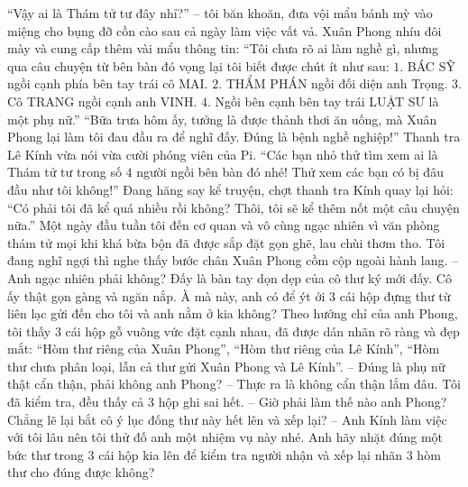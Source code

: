 	“Vậy ai là Thám tử tư đây nhỉ?” -- tôi băn khoăn, đưa vội mẩu bánh mỳ vào miệng cho bụng đỡ cồn cào sau cả ngày làm việc vất vả. 
	\vskip 0.1cm
	Xuân Phong nhíu đôi mày và cung cấp thêm vài mẩu thông tin: “Tôi chưa rõ ai làm nghề gì, nhưng qua câu chuyện từ bên bàn đó vọng lại tôi biết được chút ít như sau: 
	\vskip 0.1cm
	$1.$ BÁC SỸ ngồi cạnh phía bên tay trái cô MAI. 
	\vskip 0.1cm
	$2.$ THẨM PHÁN ngồi đối diện anh Trọng.
	\vskip 0.1cm
	$3.$ Cô TRANG ngồi cạnh anh VINH. 
	\vskip 0.1cm
	$4.$ Ngồi bên cạnh bên tay trái LUẬT SƯ là một phụ nữ.” 
	\vskip 0.1cm
	“Bữa trưa hôm ấy, tưởng là được thảnh thơi ăn uống, mà Xuân Phong lại làm tôi đau đầu ra để nghĩ đấy. Đúng là bệnh nghề nghiệp!” Thanh tra Lê Kính vừa nói vừa cười phóng viên của Pi. “Các bạn nhỏ thử tìm xem ai là Thám tử tư trong số $4$ người ngồi bên bàn đó nhé! Thử xem các bạn có bị đâu đầu như tôi không!”
	\vskip 0.1cm
	Đang hăng say kể truyện, chợt thanh tra Kính quay lại hỏi: “Có phải tôi đã kể quá nhiều rồi không? Thôi, tôi sẽ kể thêm nốt một câu chuyện nữa.”
	\vskip 0.1cm
	{\color{toanhocdoisong}{BA CHIẾC HỘP VÀ CÔ THƯ KÝ}}
	\vskip 0.1cm
	Một ngày đầu tuần tôi đến cơ quan và vô cùng ngạc nhiên vì văn phòng thám tử mọi khi khá bừa bộn đã được sắp đặt gọn ghẽ, lau chùi thơm tho. Tôi đang nghĩ ngợi thì nghe thấy bước chân Xuân Phong cồm cộp ngoài hành lang. 
	\vskip 0.1cm
	-- Anh ngạc nhiên phải không? Đấy là bàn tay dọn dẹp của cô thư ký mới đấy. Cô ấy thật gọn gàng và ngăn nắp. À mà này, anh có để ýt ới $3$ cái hộp đựng thư từ liên lạc gửi đến cho tôi và anh nằm ở kia không? 
	\vskip 0.1cm
	Theo hướng chỉ của anh Phong, tôi thấy $3$ cái hộp gỗ vuông vức đặt cạnh nhau, đã được dán nhãn rõ ràng và đẹp mắt: “Hòm thư riêng của Xuân Phong”, “Hòm thư riêng của Lê Kính”, “Hòm thư chưa phân loại, lẫn cả thư gửi Xuân Phong và Lê Kính”. 
	\vskip 0.1cm
	-- Đúng là phụ nữ thật cẩn thận, phải không anh Phong? 
	\vskip 0.1cm
	-- Thực ra là không cẩn thận lắm đâu. Tôi đã kiểm tra, đều thấy cả $3$ hộp ghi sai hết. 
	\vskip 0.1cm
	-- Giờ phải làm thế nào anh Phong? Chẳng lẽ lại bắt cô ý lục đống thư này hết lên và xếp lại? 
	\vskip 0.1cm
	-- Anh Kính làm việc với tôi lâu nên tôi thử đố anh một nhiệm vụ này nhé. Anh hãy nhặt đúng một bức thư trong $3$ cái hộp kia lên để kiểm tra người nhận và xếp lại nhãn $3$ hòm thư cho đúng được không? 
